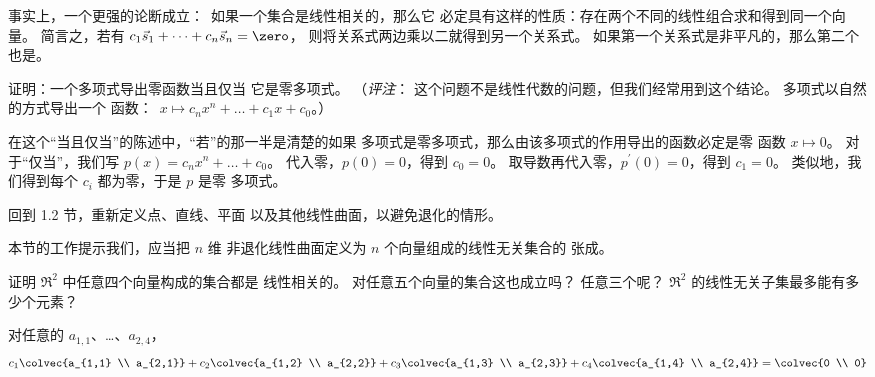 \begin{exercises}
\begin{answer}
\begin{exparts}
          事实上，一个更强的论断成立：~如果一个集合是线性相关的，那么它
          必定具有这样的性质：存在两个不同的线性组合求和得到同一个向量。
          简言之，若有 \( c_1\vec{s}_1+\dots+c_n\vec{s}_n=\zero \)，
          则将关系式两边乘以二就得到另一个关系式。
          如果第一个关系式是非平凡的，那么第二个也是。
      \end{exparts}
    \end{answer}
  \item  \label{exer:PolyZeroFcnOnlyIfZeroPol}
     证明：一个多项式导出零函数当且仅当
     它是零多项式。
     （\textit{评注}：
     这个问题不是线性代数的问题，但我们经常用到这个结论。
     多项式以自然的方式导出一个
     函数：~$x\mapsto c_nx^n+\dots+c_1x+c_0$。）
     \begin{answer}
       在这个“当且仅当”的陈述中，“若”的那一半是清楚的\Dash 如果
       多项式是零多项式，那么由该多项式的作用导出的函数必定是零
       函数 $x\mapsto 0$。
       对于“仅当”，我们写 $p(x)=c_nx^n+\dots+c_0$。
       代入零，$p(0)=0$，得到 $c_0=0$。
       取导数再代入零，$p^\prime(0)=0$，得到
       $c_1=0$。
       类似地，我们得到每个 $c_i$ 都为零，于是 $p$ 是零
       多项式。
     \end{answer}
  \item
    回到 1.2 节，重新定义点、直线、平面
    以及其他线性曲面，以避免退化的情形。
    \begin{answer}
      本节的工作提示我们，应当把 \( n \) 维
      非退化线性曲面定义为 \( n \) 个向量组成的线性无关集合的
      张成。
    \end{answer}
  \item
    \begin{exparts}
      \partsitem 证明 \( \Re^2 \) 中任意四个向量构成的集合都是
         线性相关的。
      \partsitem 对任意五个向量的集合这也成立吗？
         任意三个呢？
      \partsitem $\Re^2$ 的线性无关子集最多能有多少个元素？
    \end{exparts}
    \begin{answer}
      \begin{exparts}
        \partsitem 对任意的 $a_{1,1}$、\ldots、$a_{2,4}$，
          \begin{equation*}
            c_1\colvec{a_{1,1} \\ a_{2,1}}
            +c_2\colvec{a_{1,2} \\ a_{2,2}}
            +c_3\colvec{a_{1,3} \\ a_{2,3}}
            +c_4\colvec{a_{1,4} \\ a_{2,4}}
            =\colvec{0 \\ 0}

\end{equation*}
\end{exparts}
\end{answer}
\end{exercises}
